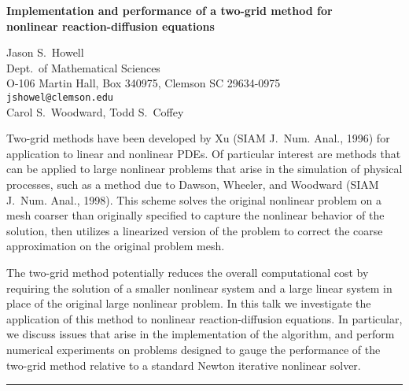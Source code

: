 \documentclass[twosided]{report}
\begin{document}
\begin{center}
{\large			%
{\bf Implementation and performance of a two-grid method for \\
	nonlinear reaction-diffusion equations}}

	Jason S.~Howell \\
	Dept.~of Mathematical Sciences \\
	O-106 Martin Hall, Box 340975, Clemson SC 29634-0975 \\
	{\tt jshowel@clemson.edu} \\
	Carol S.~Woodward, Todd S.~Coffey
\end{center}
Two-grid methods have been developed by Xu (SIAM J.~Num.
Anal., 1996) for application to linear and nonlinear PDEs. Of
particular interest are methods that can be applied to large
nonlinear problems that arise in the simulation of physical
processes, such as a method due to Dawson, Wheeler, and
Woodward (SIAM J.~Num. Anal., 1998). This scheme solves the
original nonlinear problem on a mesh coarser than originally
specified to capture the nonlinear behavior of the solution,
then utilizes a linearized version of the problem to correct
the coarse approximation on the original problem mesh.

The
two-grid method potentially reduces the overall
computational cost by requiring the solution of a smaller
nonlinear system and a large linear system in place of the
original large nonlinear problem. In this talk we
investigate the application of this method to nonlinear
reaction-diffusion equations. In particular, we discuss
issues that arise in the implementation of the algorithm,
and perform numerical experiments on problems designed to
gauge the performance of the two-grid method relative to a
standard Newton iterative nonlinear solver.



	\begin{center} \rule{6in}{1pt} \end{center}
\end{document}

